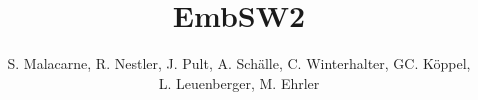\documentclass[titlepage=true]{scrartcl}
\title{EmbSW2}
\author{S. Malacarne, R. Nestler, J. Pult, A. Schälle, C.
Winterhalter, GC. Köppel, \\L. Leuenberger, M. Ehrler}
\begin{document}
\begin{titlepage}
   \thispagestyle{empty}
   \maketitle
\end{titlepage}

\lstset{style=Csharp}

\tableofcontents \newpage









\end{document}
